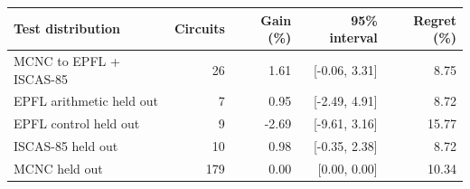 \begin{tabular}{@{}lrrrr@{}}
\toprule
\textbf{Test distribution} & \textbf{Circuits} & \textbf{Gain (\%)} & \textbf{95\% interval} & \textbf{Regret (\%)} \\
\midrule
MCNC to EPFL + ISCAS-85 & 26 & 1.61 & [-0.06, 3.31] & 8.75 \\
EPFL arithmetic held out & 7 & 0.95 & [-2.49, 4.91] & 8.72 \\
EPFL control held out & 9 & -2.69 & [-9.61, 3.16] & 15.77 \\
ISCAS-85 held out & 10 & 0.98 & [-0.35, 2.38] & 8.72 \\
MCNC held out & 179 & 0.00 & [0.00, 0.00] & 10.34 \\
\bottomrule
\end{tabular}
